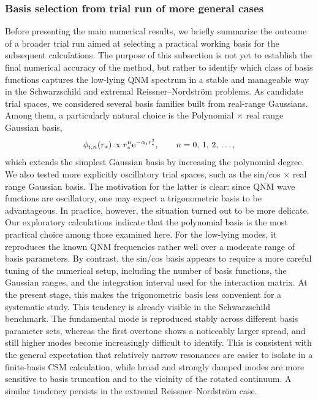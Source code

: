 \subsubsection{Basis selection from trial run of more general cases}
Before presenting the main numerical results, we briefly summarize the outcome of a broader trial run aimed at selecting a practical working basis for the subsequent calculations.
The purpose of this subsection is not yet to establish the final numerical accuracy of the method, but rather to identify which class of basis functions captures the low-lying QNM spectrum in a stable and manageable way in the Schwarzschild and extremal Reissner--Nordstr\"om problems.
As candidate trial spaces, we considered several basis families built from real-range Gaussians.
Among them, a particularly natural choice is the Polynomial $\times$ real range Gaussian basis,
\begin{align}
    \phi_{i,n}(r_*)
    \propto
    r_*^n \mathrm{e}^{-\alpha_i r_*^2},
    \qquad
    \text{$n=0$, $1$, $2$, \dots} ,
\end{align}
which extends the simplest Gaussian basis by increasing the polynomial degree.
We also tested more explicitly oscillatory trial spaces, such as the sin/cos $\times$ real range Gaussian basis.
The motivation for the latter is clear: since QNM wave functions are oscillatory, one may expect a trigonometric basis to be advantageous.
In practice, however, the situation turned out to be more delicate.
Our exploratory calculations indicate that the polynomial basis is the most practical choice among those examined here.
For the low-lying modes, it reproduces the known QNM frequencies rather well over a moderate range of basis parameters.
By contrast, the sin/cos basis appears to require a more careful tuning of the numerical setup, including the number of basis functions, the Gaussian ranges, and the integration interval used for the interaction matrix.
At the present stage, this makes the trigonometric basis less convenient for a systematic study.
This tendency is already visible in the Schwarzschild benchmark.
The fundamental mode is reproduced stably across different basis parameter sets, whereas the first overtone shows a noticeably larger spread, and still higher modes become increasingly difficult to identify.
This is consistent with the general expectation that relatively narrow resonances are easier to isolate in a finite-basis CSM calculation, while broad and strongly damped modes are more sensitive to basis truncation and to the vicinity of the rotated continuum.
A similar tendency persists in the extremal Reissner--Nordstr\"om case.
